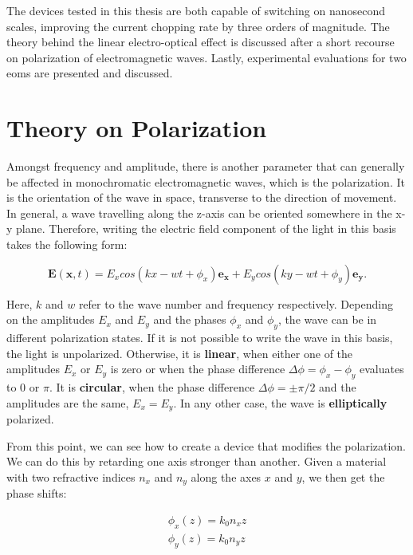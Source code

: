 The devices tested in this thesis are both capable of switching on nanosecond scales, improving the current chopping rate by three orders of magnitude. The theory behind the linear electro-optical effect is discussed after a short recourse on polarization of electromagnetic waves. Lastly, experimental evaluations for two \acp{eom} are presented and discussed.


\section{Theory on Polarization}

\label{sec:pol}

Amongst frequency and amplitude, there is another parameter that can generally be affected in monochromatic electromagnetic waves, which is the polarization. It is the orientation of the wave in space, transverse to the direction of movement.  In general, a wave travelling along the z-axis can be oriented somewhere in the x-y plane. Therefore, writing the electric field component of the light in this basis takes the following form:

\begin{equation}
	\mathbf{E}(\mathbf{x}, t) = E_x cos\left(kx - wt + \phi_x\right) \mathbf{e_x} + E_y cos\left(ky - wt + \phi_y\right) \mathbf{e_y} .
\end{equation}

Here, $k$ and $w$ refer to the wave number and frequency respectively.
Depending on the amplitudes $E_x$ and $E_y$ and the phases $\phi_x$ and $\phi_y$, the wave can be in different polarization states. If it is not possible to write the wave in this basis, the light is unpolarized. Otherwise, it is \textbf{linear}, when either one of the amplitudes $E_x$ or $E_y$ is zero or when the phase difference $\Delta \phi = \phi_x - \phi_y$ evaluates to 0 or $\pi$. It is \textbf{circular}, when the phase difference $\Delta \phi = \pm \pi/2$ and the amplitudes are the same, $E_x = E_y$. In any other case, the wave is \textbf{elliptically} polarized.

From this point, we can see how to create a device that modifies the polarization. We can do this by retarding one axis stronger than another. Given a material with two refractive indices $n_x$ and $n_y$ along the axes $x$ and $y$, we then get the phase shifts:

\begin{align}
	\phi_x(z) = k_0 n_x z \\
	\phi_y(z) = k_0 n_y z
\end{align}
\label{eq:pol,phases}

